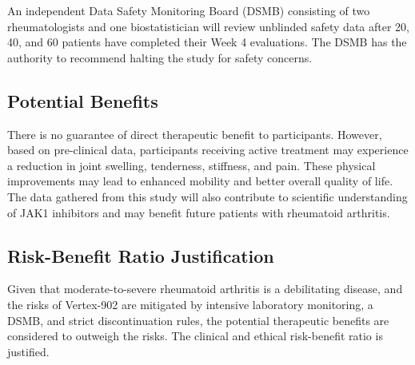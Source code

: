 An independent Data Safety Monitoring Board (DSMB) consisting of two rheumatologists and one biostatistician will review unblinded safety data after 20, 40, and 60 patients have completed their Week 4 evaluations. The DSMB has the authority to recommend halting the study for safety concerns.

\subsection{Potential Benefits}
There is no guarantee of direct therapeutic benefit to participants. However, based on pre-clinical data, participants receiving active treatment may experience a reduction in joint swelling, tenderness, stiffness, and pain. These physical improvements may lead to enhanced mobility and better overall quality of life. The data gathered from this study will also contribute to scientific understanding of JAK1 inhibitors and may benefit future patients with rheumatoid arthritis.

\subsection{Risk-Benefit Ratio Justification}
Given that moderate-to-severe rheumatoid arthritis is a debilitating disease, and the risks of Vertex-902 are mitigated by intensive laboratory monitoring, a DSMB, and strict discontinuation rules, the potential therapeutic benefits are considered to outweigh the risks. The clinical and ethical risk-benefit ratio is justified.

